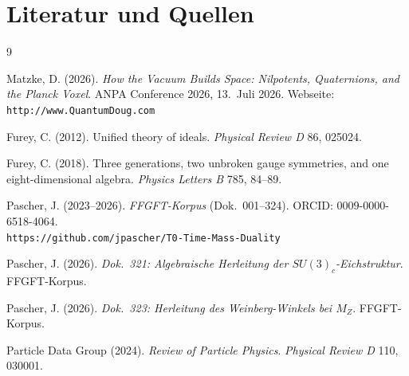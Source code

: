 \section*{Literatur und Quellen}

\begin{thebibliography}{9}

Matzke, D. (2026).
\textit{How the Vacuum Builds Space: Nilpotents, Quaternions,
and the Planck Voxel}.
ANPA Conference 2026, 13.~Juli 2026.
Webseite: \texttt{http://www.QuantumDoug.com}

Furey, C. (2012).
Unified theory of ideals.
\textit{Physical Review D} 86, 025024.

Furey, C. (2018).
Three generations, two unbroken gauge symmetries, and
one eight-dimensional algebra.
\textit{Physics Letters B} 785, 84--89.

Pascher, J. (2023--2026).
\textit{FFGFT-Korpus} (Dok.~001--324).
ORCID: 0009-0000-6518-4064.\\
\texttt{https://github.com/jpascher/T0-Time-Mass-Duality}

Pascher, J. (2026). \textit{Dok.~321: Algebraische Herleitung
der $SU(3)_c$-Eichstruktur}. FFGFT-Korpus.

Pascher, J. (2026). \textit{Dok.~323: Herleitung des Weinberg-Winkels
bei $M_Z$}. FFGFT-Korpus.

Particle Data Group (2024). \textit{Review of Particle Physics}.
\textit{Physical Review D} 110, 030001.

\end{thebibliography}

